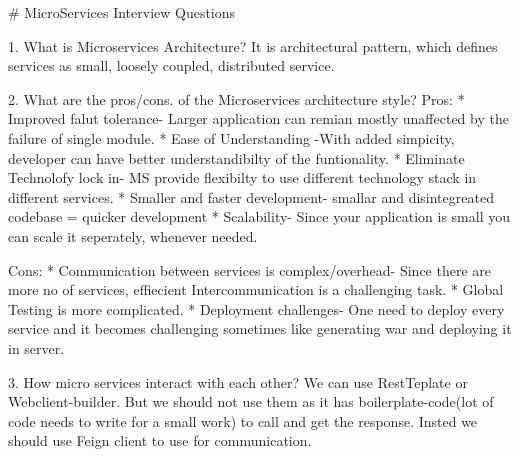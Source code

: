 # MicroServices Interview Questions

1. What is Microservices Architecture?
	It is architectural pattern, which defines services as small, loosely coupled, distributed service.

2. What are the pros/cons. of the Microservices architecture style?
	Pros: 
		* Improved falut tolerance- Larger application can remian mostly unaffected by the failure of single module.
		* Ease of Understanding -With added simpicity, developer can have better understandibilty of the funtionality.
		* Eliminate Technolofy lock in- MS provide flexibilty to use different technology stack in different services.
		* Smaller and faster development- smallar and disintegreated codebase = quicker development
		* Scalability- Since your application is small you can scale it seperately, whenever needed.
		
	Cons:
		* Communication between services is complex/overhead-  Since there are more no of services, effiecient Intercommunication is a challenging task.
		* Global Testing is more complicated.
		* Deployment challenges- One need to deploy every service and it becomes challenging sometimes like generating war and deploying it in server.
		
3. How micro services interact with each other?
	We can use RestTeplate or Webclient-builder. 
	But we should not use them as it has boilerplate-code(lot of code needs to write for a small work) to call and get the response.
	Insted we should use Feign client to use for communication.
	